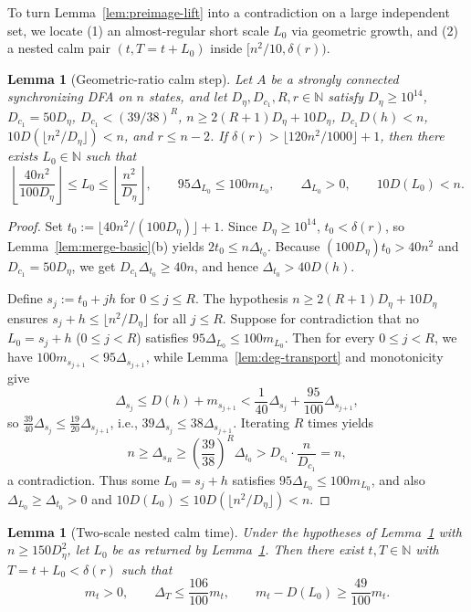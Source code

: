 \documentclass[11pt]{article}
\newtheorem{lemma}[theorem]{Lemma}
\theoremstyle{definition}
\theoremstyle{remark}
\newcommand{\N}{\mathbb{N}}
\begin{document}
To turn Lemma~\ref{lem:preimage-lift} into a contradiction on a large independent set, we locate (1) an almost-regular short scale $L_0$ via geometric growth, and (2) a nested calm pair $(t, T = t + L_0)$ inside $[n^2/10, \delta(r))$.

\begin{lemma}[Geometric-ratio calm step]\label{lem:geom-calm}
Let $A$ be a strongly connected synchronizing DFA on $n$ states, and let $D_\eta, D_{c_1}, R, r \in \N$ satisfy $D_\eta \ge 10^{14}$, $D_{c_1} = 50 D_\eta$, $D_{c_1} < (39/38)^R$, $n \ge 2(R + 1) D_\eta + 10 D_\eta$, $D_{c_1} D(h) < n$, $10 D(\lfloor n^2 / D_\eta \rfloor) < n$, and $r \le n - 2$. If $\delta(r) > \lfloor 120 n^2 / 1000 \rfloor + 1$, then there exists $L_0 \in \N$ such that
\[
  \left\lfloor \frac{40 n^2}{100 D_\eta} \right\rfloor \le L_0 \le \left\lfloor \frac{n^2}{D_\eta} \right\rfloor, \qquad
  95 \Delta_{L_0} \le 100 m_{L_0}, \qquad \Delta_{L_0} > 0, \qquad 10 D(L_0) < n.
\]
\end{lemma}

\begin{proof}
Set $t_0 := \lfloor 40 n^2 / (100 D_\eta) \rfloor + 1$. Since $D_\eta \ge 10^{14}$, $t_0 < \delta(r)$, so Lemma~\ref{lem:merge-basic}(b) yields $2 t_0 \le n \Delta_{t_0}$. Because $(100 D_\eta) t_0 > 40 n^2$ and $D_{c_1} = 50 D_\eta$, we get $D_{c_1} \Delta_{t_0} \ge 40 n$, and hence $\Delta_{t_0} > 40 D(h)$.

Define $s_j := t_0 + j h$ for $0 \le j \le R$. The hypothesis $n \ge 2(R+1) D_\eta + 10 D_\eta$ ensures $s_j + h \le \lfloor n^2 / D_\eta \rfloor$ for all $j \le R$. Suppose for contradiction that no $L_0 = s_j + h$ ($0 \le j < R$) satisfies $95 \Delta_{L_0} \le 100 m_{L_0}$. Then for every $0 \le j < R$, we have $100 m_{s_{j+1}} < 95 \Delta_{s_{j+1}}$, while Lemma~\ref{lem:deg-transport} and monotonicity give
\[
  \Delta_{s_j} \le D(h) + m_{s_{j+1}} < \frac{1}{40} \Delta_{s_j} + \frac{95}{100} \Delta_{s_{j+1}},
\]
so $\frac{39}{40} \Delta_{s_j} \le \frac{19}{20} \Delta_{s_{j+1}}$, i.e., $39 \Delta_{s_j} \le 38 \Delta_{s_{j+1}}$. Iterating $R$ times yields
\[
  n \ge \Delta_{s_R} \ge \left(\frac{39}{38}\right)^R \Delta_{t_0} > D_{c_1} \cdot \frac{n}{D_{c_1}} = n,
\]
a contradiction. Thus some $L_0 = s_j + h$ satisfies $95 \Delta_{L_0} \le 100 m_{L_0}$, and also $\Delta_{L_0} \ge \Delta_{t_0} > 0$ and $10 D(L_0) \le 10 D(\lfloor n^2 / D_\eta \rfloor) < n$.
\end{proof}

\begin{lemma}[Two-scale nested calm time]\label{lem:two-scale-calm}
Under the hypotheses of Lemma~\ref{lem:geom-calm} with $n \ge 150 D_\eta^2$, let $L_0$ be as returned by Lemma~\ref{lem:geom-calm}. Then there exist $t, T \in \N$ with $T = t + L_0 < \delta(r)$ such that
\[
  m_t > 0, \qquad \Delta_T \le \frac{106}{100} m_t, \qquad m_t - D(L_0) \ge \frac{49}{100} m_t.
\]
\end{lemma}
\end{document}
